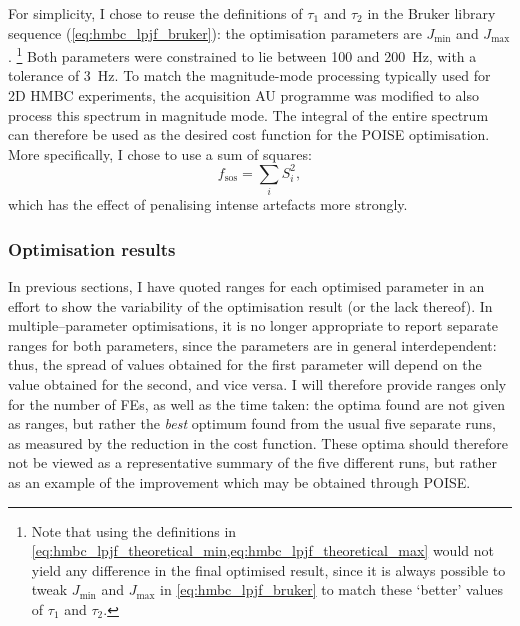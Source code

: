 For simplicity, I chose to reuse the definitions of $\tau_1$ and $\tau_2$ in the Bruker library sequence (\cref{eq:hmbc_lpjf_bruker}): the optimisation parameters are $J_\text{min}$ and $J_\text{max}$.%
\footnote{Note that using the definitions in \cref{eq:hmbc_lpjf_theoretical_min,eq:hmbc_lpjf_theoretical_max} would not yield any difference in the final optimised result, since it is always possible to tweak $J_\text{min}$ and $J_\text{max}$ in \cref{eq:hmbc_lpjf_bruker} to match these `better' values of $\tau_1$ and $\tau_2$.}
Both parameters were constrained to lie between 100 and \SI{200}{\Hz}, with a tolerance of \SI{3}{\Hz}.
To match the magnitude-mode processing typically used for 2D HMBC experiments, the acquisition AU programme was modified to also process this spectrum in magnitude mode.
The integral of the entire spectrum can therefore be used as the desired cost function for the POISE optimisation.
More specifically, I chose to use a sum of squares:
\begin{equation}
    \label{eq:sos_cost_function}
    f_\text{sos} = \sum_i S_i^2,
\end{equation}
which has the effect of penalising intense artefacts more strongly.


\subsubsection{Optimisation results}

In previous sections, I have quoted ranges for each optimised parameter in an effort to show the variability of the optimisation result (or the lack thereof).
In multiple--parameter optimisations, it is no longer appropriate to report separate ranges for both parameters, since the parameters are in general interdependent: thus, the spread of values obtained for the first parameter will depend on the value obtained for the second, and vice versa.
I will therefore provide ranges only for the number of FEs, as well as the time taken: the optima found are not given as ranges, but rather the \textit{best} optimum found from the usual five separate runs, as measured by the reduction in the cost function.
These optima should therefore not be viewed as a representative summary of the five different runs, but rather as an example of the improvement which may be obtained through POISE.


